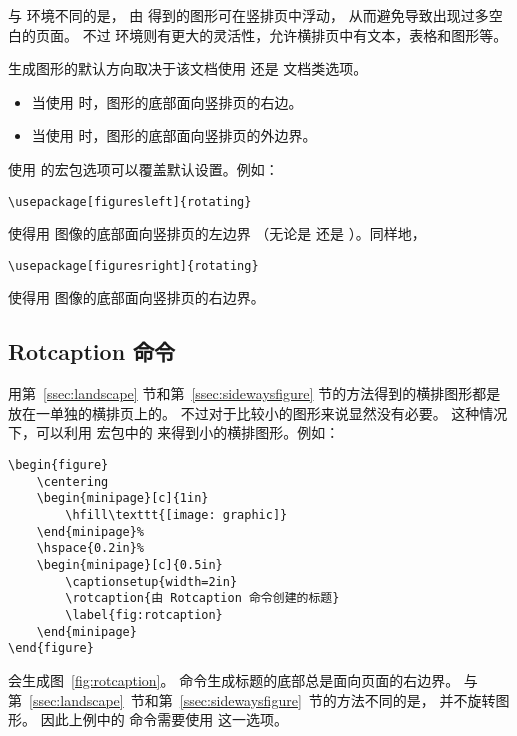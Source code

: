 与  环境不同的是，
由  得到的图形可在竖排页中浮动，
从而避免导致出现过多空白的页面。
不过  环境则有更大的灵活性，允许横排页中有文本，表格和图形等。

 生成图形的默认方向取决于该文档使用  还是  文档类选项。
\begin{itemize}
	\item 当使用  时，图形的底部面向竖排页的右边。
	\item 当使用  时，图形的底部面向竖排页的外边界。
\end{itemize}
使用  的宏包选项可以覆盖默认设置。例如：
\begin{lstlisting}
\usepackage[figuresleft]{rotating}
\end{lstlisting}
使得用  图像的底部面向竖排页的左边界
（无论是  还是 ）。同样地，
\begin{lstlisting}
\usepackage[figuresright]{rotating}
\end{lstlisting}
使得用  图像的底部面向竖排页的右边界。

\subsection{Rotcaption 命令}

用第~\ref{ssec:landscape} 节和第~\ref{ssec:sidewaysfigure} 节的方法得到的横排图形都是放在一单独的横排页上的。
不过对于比较小的图形来说显然没有必要。
这种情况下，可以利用  宏包中的  来得到小的横排图形。例如：
\begin{lstlisting}
\begin{figure}
	\centering
	\begin{minipage}[c]{1in}
		\hfill\texttt{[image: graphic]}
	\end{minipage}%
	\hspace{0.2in}%
	\begin{minipage}[c]{0.5in}
		\captionsetup{width=2in}
		\rotcaption{由 Rotcaption 命令创建的标题}
		\label{fig:rotcaption}
	\end{minipage}
\end{figure}
\end{lstlisting}
会生成图~\ref{fig:rotcaption}。
 命令生成标题的底部总是面向页面的右边界。
与第~\ref{ssec:landscape}~节和第~\ref{ssec:sidewaysfigure}~节的方法不同的是，
 并不旋转图形。
因此上例中的  命令需要使用  这一选项。

